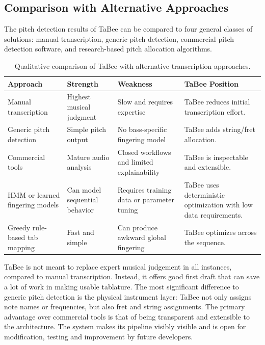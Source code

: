 \documentclass[a4paper, 12pt, titlepage]{article}
\begin{document}
\subsection{Comparison with Alternative Approaches}

The pitch detection results of TaBee can be compared to four general classes of solutions: manual transcription, generic pitch detection, commercial pitch detection software, and research-based pitch allocation algorithms.

\begin{table}[H]
    \centering
    \begin{tabular}{|p{}|p{}|p{}|p{}|}
        \hline
        \textbf{Approach} & \textbf{Strength} & \textbf{Weakness} & \textbf{TaBee Position} \\
        \hline
        Manual transcription & Highest musical judgment & Slow and requires expertise & TaBee reduces initial transcription effort. \\
        \hline
        Generic pitch detection & Simple pitch output & No bass-specific fingering model & TaBee adds string/fret allocation. \\
        \hline
        Commercial tools & Mature audio analysis & Closed workflows and limited explainability & TaBee is inspectable and extensible. \\
        \hline
        HMM or learned fingering models & Can model sequential behavior & Requires training data or parameter tuning & TaBee uses deterministic optimization with low data requirements. \\
        \hline
        Greedy rule-based tab mapping & Fast and simple & Can produce awkward global fingering & TaBee optimizes across the sequence. \\
        \hline
    \end{tabular}
    \caption{Qualitative comparison of TaBee with alternative transcription approaches.}
    \label{tab:tabee_comparative_summary}
\end{table}

TaBee is not meant to replace expert musical judgement in all instances, compared to manual transcription. Instead, it offers good first draft that can save a lot of work in making usable tablature. The most significant difference to generic pitch detection is the physical instrument layer: TaBee not only assigns note names or frequencies, but also fret and string assignments. The primary advantage over commercial tools is that of being transparent and extensible to the architecture. The system makes its pipeline visibly visible and is open for modification, testing and improvement by future developers.
\end{document}
